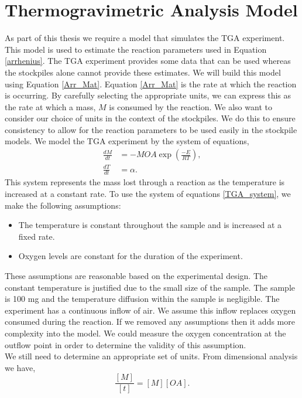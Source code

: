 \section{Thermogravimetric Analysis Model}
\label{SEC:TGA}
As part of this thesis we require a model that simulates the TGA experiment. This model is used to estimate the reaction parameters used in Equation \ref{arrhenius}. The TGA experiment provides some data that can be used whereas the stockpiles alone cannot provide these estimates. We will build this model using Equation \ref{Arr_Mat}. Equation \ref{Arr_Mat} is the rate at which the reaction is occurring. By carefully selecting the appropriate units, we can express this as the rate at which a mass, $M$ is consumed by the reaction. We also want to consider our choice of units in the context of the stockpiles. We do this to ensure consistency to allow for the reaction parameters to be used easily in the stockpile models. We model the TGA experiment by the system of equations,
\begin{align}
\frac{dM}{dt}&=-MOA\exp\left(\frac{-E}{RT}\right), \label{TGA_system} \\
\frac{dT}{dt}&=\alpha. \label{TGA_system2}
\end{align}
This system represents the mass lost through a reaction as the temperature is increased at a constant rate. To use the system of equations \ref{TGA_system}, we make the following assumptions:
\begin{itemize}
\item The temperature is constant throughout the sample and is increased at a fixed rate.
\item Oxygen levels are constant for the duration of the experiment.
\end{itemize}
These assumptions are reasonable based on the experimental design. The constant temperature is justified due to the small size of the sample. The sample is 100 mg and the temperature diffusion within the sample is negligible. The experiment has a continuous inflow of air. We assume this inflow replaces oxygen consumed during the reaction. If we removed any assumptions then it adds more complexity into the model. We could measure the oxygen concentration at the outflow point in order to determine the validity of this assumption.\\
We still need to determine an appropriate set of units. From dimensional analysis we have,
\begin{equation}
\frac{\left[M\right]}{\left[t\right]}=\left[M\right]\left[OA\right].
\end{equation}
